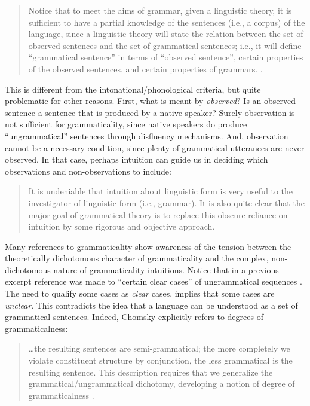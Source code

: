 \begin{quote}	
  Notice that to meet the aims of grammar, given a linguistic theory, it is sufficient to have a partial knowledge of the sentences (i.e., a corpus) of the language, since a linguistic theory will state the relation between the set of observed sentences and the set of grammatical sentences; i.e., it will define “grammatical sentence” in terms of “observed sentence”, certain properties of the observed sentences, and certain properties of grammars. \citep[14]{Chomsky1957}.
\end{quote}

  This is different from the intonational/phonological criteria, but quite problematic for other reasons. First, what is meant by \textit{observed}? Is an observed sentence a sentence that is produced by a native speaker? Surely observation is not sufficient for grammaticality, since native speakers do produce “ungrammatical” sentences through disfluency mechanisms. And, observation cannot be a necessary condition, since plenty of grammatical utterances are never observed. In that case, perhaps intuition can guide us in deciding which observations and non-observations to include:
  
\begin{quote}	
It is undeniable that intuition about linguistic form is very useful to the investigator of linguistic form (i.e., grammar). It is also quite clear that the major goal of grammatical theory is to replace this obscure reliance on intuition by some rigorous and objective approach. \citep[93-94]{Chomsky1957}
\end{quote}

  Many references to grammaticality show awareness of the tension between the theoretically dichotomous character of grammaticality and the complex, non-dichotomous nature of grammaticality intuitions. Notice that in a previous excerpt reference was made to “certain clear cases” of ungrammatical sequences \citep[113]{Chomsky1956}. The need to qualify some cases as \textit{clear} cases, implies that some cases are \textit{unclear}. This contradicts the idea that a language can be understood as a set of grammatical sentences. Indeed, Chomsky explicitly refers to degrees of grammaticalness: 

\begin{quote}	
…the resulting sentences are semi-grammatical; the more completely we violate constituent structure by conjunction, the less grammatical is the resulting sentence. This description requires that we generalize the grammatical/ungrammatical dichotomy, developing a notion of degree of grammaticalness \citep[36]{Chomsky1957}.
\end{quote}

